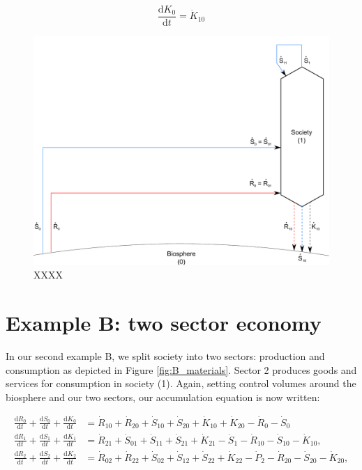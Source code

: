 \begin{equation} \label{eq:A_K0_balance}
	\frac{\mathrm{d}K_{0}}{\mathrm{d}t}		
	= \dot{K}_{10}
\end{equation}

\begin{figure}[h!]
\centering
\includegraphics[width=0.8\linewidth]{Part_1/Chapter_Materials/images/1_sector_materials.pdf}
\caption{XXXX}
\label{fig:A_materials}
\end{figure}

\section{Example B: two sector economy}
\label{sec:B_materials}

In our second example B, we split society into two sectors: production and consumption as depicted in Figure \ref{fig:B_materials}. Sector 2 produces goods and services for consumption in society (1). Again, setting control volumes around the biosphere and our two sectors, our accumulation equation is now written:

\begin{align} \label{eq:B_CV_0_to_2}
	\frac{\mathrm{d}R_{0}}{\mathrm{d}t} 
	+ \frac{\mathrm{d}S_{0}}{\mathrm{d}t}	
	+ \frac{\mathrm{d}K_0}{\mathrm{d}t}		&
	=  \dot{R}_{10} + \dot{R}_{20} 
	+ \dot{S}_{10} + \dot{S}_{20} 
	+ \dot{K}_{10} + \dot{K}_{20} 
	- \dot{R}_{0} 
	- \dot{S}_{0} 							\\
	\frac{\mathrm{d}R_{1}}{\mathrm{d}t} 
	+ \frac{\mathrm{d}S_{1}}{\mathrm{d}t}	
	+ \frac{\mathrm{d}K_{1}}{\mathrm{d}t}	&
	=  \dot{R}_{21} 
	+ \dot{S}_{01} 
	+ \dot{S}_{11} 
	+ \dot{S}_{21}
	+ \dot{K}_{21}
	- \dot{S}_{1} 
	- \dot{R}_{10} 
	- \dot{S}_{10} 
	- \dot{K}_{10},							\\
	\frac{\mathrm{d}R_{2}}{\mathrm{d}t} 
	+ \frac{\mathrm{d}S_{2}}{\mathrm{d}t}
	+ \frac{\mathrm{d}K_{2}}{\mathrm{d}t}	&
	=  \dot{R}_{02} 
	+ \dot{R}_{22} 
	+ \dot{S}_{02} 
	+ \dot{S}_{12} 
	+ \dot{S}_{22} 
	+ \dot{K}_{22}
	- \dot{P}_{2}
	- \dot{R}_{20} 
	- \dot{S}_{20} 
	- \dot{K}_{20},
\end{align}

